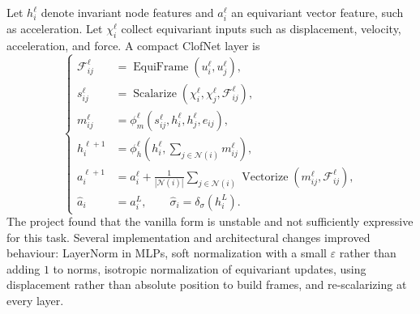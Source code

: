 \documentclass[11pt,a4paper,reqno]{amsart}
\theoremstyle{definition}
\theoremstyle{remark}
\numberwithin{equation}{section}
\newcommand{\Vectorize}{\operatorname{Vectorize}}
\newcommand{\Scalarize}{\operatorname{Scalarize}}
\newcommand{\EquiFrame}{\operatorname{EquiFrame}}
\begin{document}
Let $h_i^\ell$ denote invariant node features and $a_i^\ell$ an equivariant vector feature, such as acceleration. Let $\chi_i^\ell$ collect equivariant inputs such as displacement, velocity, acceleration, and force. A compact ClofNet layer is
\begin{equation}
\left\{
\begin{aligned}
    \mathcal F_{ij}^\ell &= \EquiFrame(u_i^\ell,u_j^\ell),\\
    s_{ij}^\ell &= \Scalarize(\chi_i^\ell,\chi_j^\ell,\mathcal F_{ij}^\ell),\\
    m_{ij}^\ell &= \phi_m^\ell(s_{ij}^\ell,h_i^\ell,h_j^\ell,e_{ij}),\\
    h_i^{\ell+1} &= \phi_h^\ell\left(h_i^\ell,\sum_{j\in\mathcal N(i)}m_{ij}^\ell\right),\\
    a_i^{\ell+1} &= a_i^\ell+\frac{1}{|\mathcal N(i)|}\sum_{j\in\mathcal N(i)}
    \Vectorize(m_{ij}^\ell,\mathcal F_{ij}^\ell),\\
    \hat a_i&=a_i^L,\qquad \hat\sigma_i=\delta_\sigma(h_i^L).
\end{aligned}
\right.
\label{eq:clofnet-vanilla}
\end{equation}
The project found that the vanilla form is unstable and not sufficiently expressive for this task. Several implementation and architectural changes improved behaviour: LayerNorm in MLPs, soft normalization with a small $\varepsilon$ rather than adding $1$ to norms, isotropic normalization of equivariant updates, using displacement rather than absolute position to build frames, and re-scalarizing at every layer.
\end{document}

